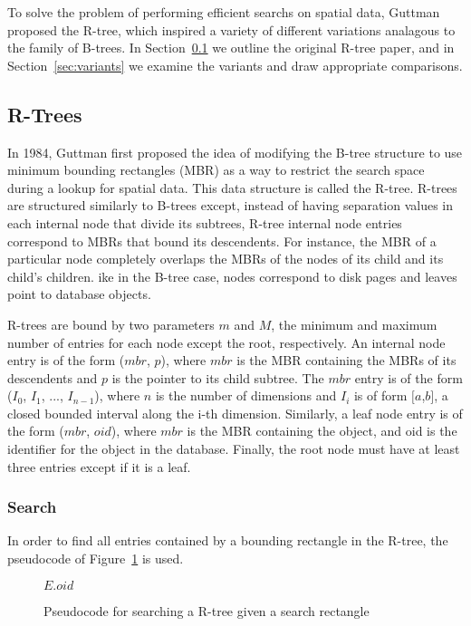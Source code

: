 To solve the problem of performing efficient searchs on spatial data, 
Guttman proposed the R-tree, which inspired a variety of different 
variations analagous to the family of B-trees. In Section~\ref{sec:rtrees}
we outline the original R-tree paper, and in Section~\ref{sec:variants}
we examine the variants and draw appropriate comparisons.

\subsection{R-Trees}
\label{sec:rtrees}
In 1984, Guttman first proposed the idea of modifying the B-tree structure to
use minimum bounding rectangles (MBR) as a way to restrict the search space 
during a lookup for spatial data. This data structure is called the R-tree.
R-trees are structured similarly to B-trees except, instead of having separation
values in each internal node that divide its subtrees, R-tree internal node
entries correspond to MBRs that bound its descendents. For instance, the MBR of 
a particular node completely overlaps the MBRs of the nodes of its child and 
its child's children. ike in the B-tree case, nodes correspond to disk pages 
and leaves point to database objects.

R-trees are bound by two parameters $m$ and $M$, the minimum and maximum number
of entries for each node except the root, respectively. An internal node entry 
is of the form ($mbr$, $p$), where $mbr$ is the MBR containing the MBRs of its 
descendents and $p$ is the pointer to its child subtree. The $mbr$ entry is of 
the form ($I_{0}$, $I_{1}$, ..., $I_{n-1}$), where $n$ is the number of 
dimensions and $I_{i}$ is of form $[a$,$b]$, a closed bounded interval along 
the i-th dimension. Similarly, a leaf node entry is of the form ($mbr$, $oid$), 
where $mbr$ is the MBR containing the object, and oid is the identifier for the 
object in the database. Finally, the root node must have at least three entries
except if it is a leaf.

\subsubsection{Search}
In order to find all entries contained by a bounding rectangle in the R-tree, 
the pseudocode of Figure~\ref{fig:R_Tree_Search} is used.

\begin{figure}
\begin{algorithmic}
					\State {}
				\EndIf
			\EndFor
		\Else
					\Return $E.oid$
				\EndIf
			\EndFor
		\EndIf
	\EndFunction
\end{algorithmic}
\caption{Pseudocode for searching a R-tree given a search rectangle}
\label{fig:R_Tree_Search}
\end{figure}

